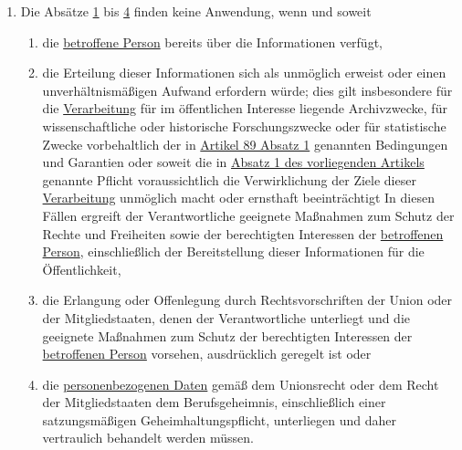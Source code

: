 \begin{enumerate}
  \item Die Absätze \hyperref[itm:14-1]{1} bis \hyperref[itm:14-4]{4} finden keine Anwendung, wenn und soweit
  \label{itm:14-5}

  \begin{enumerate}
  
    \item die \hyperref[itm:04-1]{betroffene Person} bereits über die Informationen verfügt,
    \label{itm:14-5a}

    \item die Erteilung dieser Informationen sich als unmöglich erweist oder einen unverhältnismäßigen Aufwand erfordern
     würde; dies gilt insbesondere für die \hyperref[itm:04-2]{Verarbeitung} für im öffentlichen Interesse liegende Archivzwecke, für
     wissenschaftliche oder historische Forschungszwecke oder für statistische Zwecke vorbehaltlich der in
     \hyperref[itm:89-1]{Artikel 89 Absatz 1} genannten Bedingungen und Garantien oder soweit die in \hyperref[itm:14-1]
      {Absatz 1 des vorliegenden Artikels} genannte Pflicht voraussichtlich die Verwirklichung der Ziele dieser
      \hyperref[itm:04-2]{Verarbeitung} unmöglich macht oder ernsthaft beeinträchtigt In diesen Fällen ergreift der Verantwortliche
      geeignete Maßnahmen zum Schutz der Rechte und Freiheiten sowie der berechtigten Interessen der \hyperref[itm:04-1]{betroffenen
      Person}, einschließlich der Bereitstellung dieser Informationen für die Öffentlichkeit,
    \label{itm:14-5b}

    \item die Erlangung oder Offenlegung durch Rechtsvorschriften der Union oder der Mitgliedstaaten, denen der
     Verantwortliche unterliegt und die geeignete Maßnahmen zum Schutz der berechtigten Interessen der \hyperref[itm:04-1]{betroffenen
     Person} vorsehen, ausdrücklich geregelt ist oder
    \label{itm:14-5c}

    \item die \hyperref[itm:04-1]{personenbezogenen Daten} gemäß dem Unionsrecht oder dem Recht der Mitgliedstaaten dem Berufsgeheimnis,
     einschließlich einer satzungsmäßigen Geheimhaltungspflicht, unterliegen und daher vertraulich behandelt werden
     müssen.
    \label{itm:14-5d}

  \end{enumerate}

\end{enumerate}


